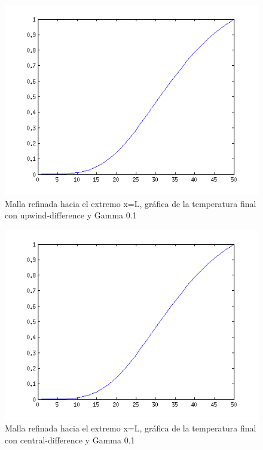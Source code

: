\documentclass[11pt]{article}
\begin{document}
\begin{figure}[tbh]
	\centering
		\includegraphics[width=1.0\textwidth]{imagen30.png}
	\caption{Malla refinada hacia el extremo x=L, gr\'afica de la temperatura final con upwind-difference y Gamma 0.1}
	\label{fig:Fig1}
\end{figure}

\begin{figure}[tbh]
	\centering
		\includegraphics[width=1.0\textwidth]{imagen31.png}
	\caption{Malla refinada hacia el extremo x=L, gr\'afica de la temperatura final con central-difference y Gamma 0.1}
	\label{fig:Fig1}
\end{figure}
\end{document}
